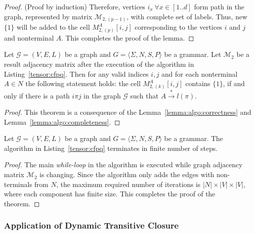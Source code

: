 \begin{proof}{(Proof by induction)}
    Therefore, vertices $i_x ~\forall x \in [1..d]$ form path in the graph, 
    represented by matrix $\mathcal{M}_{2, (p-1)}$, with complete set of labels.
    Thus, new $\{1\}$ will be added to the cell $M_{2,(p)}^A[i,j]$ corresponding to the vertices $i$ and $j$ and nonterminal $A$. This completes the proof of the lemma.

\end{proof}

\begin{theorem}
    Let $\mathcal{G} = (V,E,L)$ be a graph and $G = \langle\Sigma, N, S, P\rangle$ be a grammar.
    Let $\mathcal{M}_{2}$ be a result adjacency matrix after the execution of the algorithm in Listing~\ref{tensor:cfpq}. Then for any valid indices $i, j$ and for each nonterminal $A \in N$ the following statement holds: the cell $M_{2,(k)}^A[i,j]$ contains $\{1\}$, if and only if there is a path $i\pi j$ in the graph $\mathcal{G}$ such that $ A \xrightarrow{*} l(\pi)$.
\end{theorem}{}
    
\begin{proof}
    
    This theorem is a consequence of the  
    Lemma~\ref{lemma:algo:correctness} and 
    Lemma~\ref{lemma:algo:completeness}.
    
\end{proof}{}

\begin{theorem}{}
    Let $\mathcal{G} = (V,E,L)$ be a graph and $G = \langle\Sigma, N, S, P\rangle$ be a grammar.
    The algorithm in Listing~\ref{tensor:cfpq} terminates in finite number of steps.
\end{theorem}

\begin{proof}
    
    The main \textit{while-loop} in the algorithm is executed while graph adjacency 
    matrix $\mathcal{M}_2$ is changing. Since the algorithm only adds the edges with 
    non-terminals from $N$, the maximum required number of iterations 
    is $|N| \times |V| \times |V|$, where each component has finite size. 
    This completes the proof of the theorem.
    
\end{proof}{}


\subsubsection{Application of Dynamic Transitive Closure}

